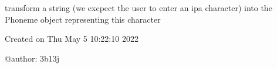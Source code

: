 \documentclass[letterpaper,10pt,english]{sphinxmanual}
\begin{document}

\begin{fulllineitems}
\label{\detokenize{index:Phoneme.get_phon}}
\sphinxAtStartPar
transform a string (we excpect the user to enter an ipa character) into the Phoneme object representing this character

\end{fulllineitems}

\label{\detokenize{index:module-Change}}
\sphinxAtStartPar
Created on Thu May  5 10:22:10 2022

\sphinxAtStartPar
@author: 3b13j
\end{document}
